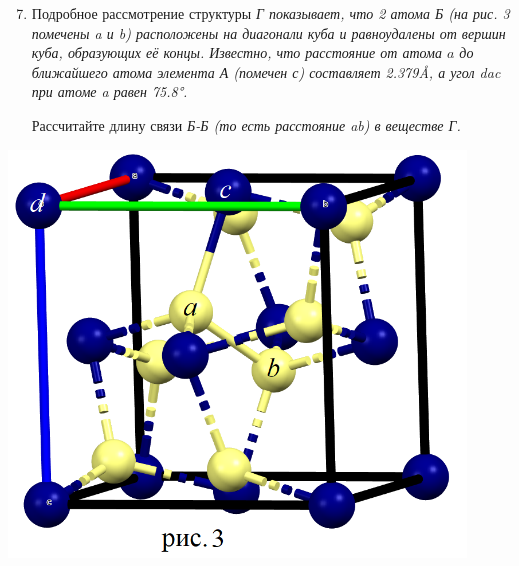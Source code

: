 \begin{minipage}{\textwidth}
  \begin{minipage}{0.6\textwidth}
    \begin{enumerate}
      \setcounter{enumi}{6}
      \item Подробное рассмотрение структуры \em{Г} показывает, что 2 атома \em{Б} (на рис. 3 помечены \textit{a} и \textit{b}) расположены на диагонали куба и равноудалены от вершин куба, образующих её концы. Известно, что расстояние от атома $a$ до ближайшего атома элемента \em{А} (помечен \textit{с}) составляет 2.379\unit{\angstrom}, а угол \textit{dac} при атоме a равен 75.8\unit{\degree}.

      Рассчитайте длину связи \em{Б-Б} (то есть расстояние \textit{ab}) в веществе \em{Г}.
    \end{enumerate}
  \end{minipage}
  \hspace{0.05\textwidth}
  \begin{minipage}{0.3\textwidth}
    \includegraphics[width=\textwidth]{problems/problem4/images/image2}
  \end{minipage}
\end{minipage}